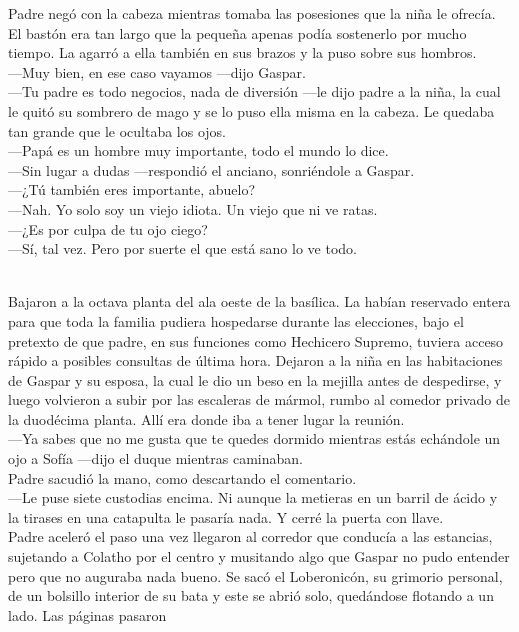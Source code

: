 \documentclass[
  letterpaper,
]{krantz}
\begin{document}
Padre negó con la cabeza mientras tomaba las posesiones que la niña le
ofrecía. El bastón era tan largo que la pequeña apenas podía sostenerlo
por mucho tiempo. La agarró a ella también en sus brazos y la puso sobre
sus hombros.\\
---Muy bien, en ese caso vayamos ---dijo Gaspar.\\
---Tu padre es todo negocios, nada de diversión ---le dijo padre a la
niña, la cual le quitó su sombrero de mago y se lo puso ella misma en la
cabeza. Le quedaba tan grande que le ocultaba los ojos.\\
---Papá es un hombre muy importante, todo el mundo lo dice.\\
---Sin lugar a dudas ---respondió el anciano, sonriéndole a Gaspar.\\
---¿Tú también eres importante, abuelo?\\
---Nah. Yo solo soy un viejo idiota. Un viejo que ni ve ratas.\\
---¿Es por culpa de tu ojo ciego?\\
---Sí, tal vez. Pero por suerte el que está sano lo ve todo.\\
\strut \\
Bajaron a la octava planta del ala oeste de la basílica. La habían
reservado entera para que toda la familia pudiera hospedarse durante las
elecciones, bajo el pretexto de que padre, en sus funciones como
Hechicero Supremo, tuviera acceso rápido a posibles consultas de última
hora. Dejaron a la niña en las habitaciones de Gaspar y su esposa, la
cual le dio un beso en la mejilla antes de despedirse, y luego volvieron
a subir por las escaleras de mármol, rumbo al comedor privado de la
duodécima planta. Allí era donde iba a tener lugar la reunión.\\
---Ya sabes que no me gusta que te quedes dormido mientras estás
echándole un ojo a Sofía ---dijo el duque mientras caminaban.\\
Padre sacudió la mano, como descartando el comentario.\\
---Le puse siete custodias encima. Ni aunque la metieras en un barril de
ácido y la tirases en una catapulta le pasaría nada. Y cerré la puerta
con llave.\\
Padre aceleró el paso una vez llegaron al corredor que conducía a las
estancias, sujetando a Colatho por el centro y musitando algo que Gaspar
no pudo entender pero que no auguraba nada bueno. Se sacó el
Loberonicón, su grimorio personal, de un bolsillo interior de su bata y
este se abrió solo, quedándose flotando a un lado. Las páginas pasaron
\end{document}
